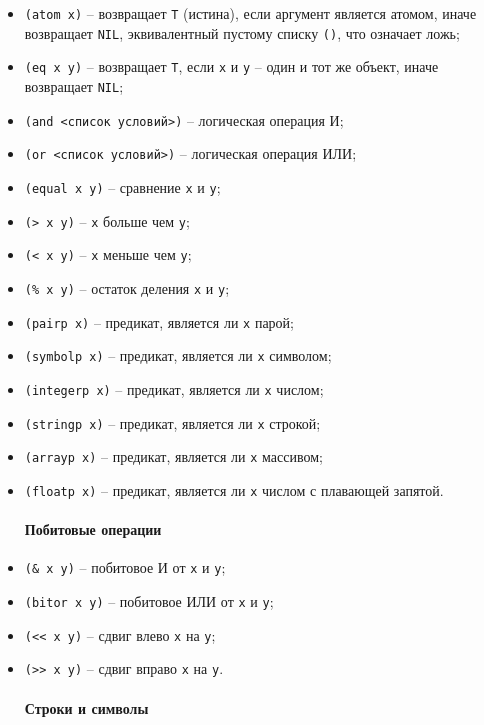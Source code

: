 \begin{itemize}
\item \texttt{(atom x)} -- возвращает \texttt{T} (истина), если аргумент является атомом, иначе возвращает \texttt{NIL}, эквивалентный пустому списку \texttt{()}, что означает ложь;
\item \texttt{(eq x y)} -- возвращает \texttt{T}, если \texttt{x} и \texttt{y} -- один и тот же объект, иначе возвращает \texttt{NIL};
\item \texttt{(and <список условий>)} -- логическая операция И;
\item \texttt{(or <список условий>)} -- логическая операция ИЛИ;
\item \texttt{(equal x y)} -- сравнение \texttt{x} и \texttt{y};
\item \texttt{(> x y)} -- \texttt{x} больше чем \texttt{y};
\item \texttt{(< x y)} -- \texttt{x} меньше чем \texttt{y};
\item \texttt{(\% x y)} -- остаток деления \texttt{x} и \texttt{y};
\item \texttt{(pairp x)} -- предикат, является ли \texttt{x} парой;
\item \texttt{(symbolp x)} -- предикат, является ли \texttt{x} символом;
\item \texttt{(integerp x)} -- предикат, является ли \texttt{x} числом;
\item \texttt{(stringp x)} -- предикат, является ли \texttt{x} строкой;
\item \texttt{(arrayp x)} -- предикат, является ли \texttt{x} массивом;
\item \texttt{(floatp x)} -- предикат, является ли \texttt{x} числом с плавающей запятой.

\paragraph{Побитовые операции}

\item \texttt{(\& x y)} -- побитовое И от \texttt{x} и \texttt{y};
\item \texttt{(bitor x y)} -- побитовое ИЛИ от \texttt{x} и \texttt{y};
\item \texttt{(<{<} x y)} -- сдвиг влево \texttt{x} на \texttt{y};
\item \texttt{(>{>} x y)} -- сдвиг вправо \texttt{x} на \texttt{y}.

\paragraph{Строки и символы}


\end{itemize}
